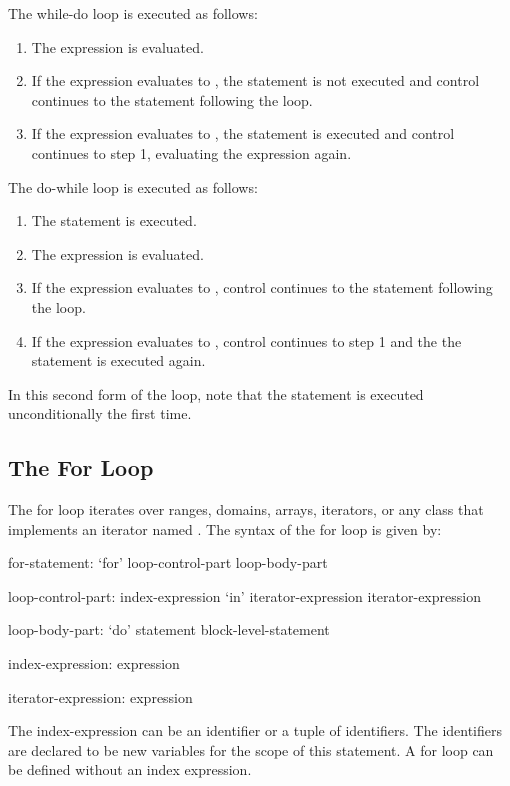 The while-do loop is executed as follows:
\begin{enumerate}
\item The expression is evaluated.
\item If the expression evaluates to , the statement is
  not executed and control continues to the statement following the
  loop.
\item If the expression evaluates to , the statement is
  executed and control continues to step 1, evaluating the expression
  again.
\end{enumerate}

The do-while loop is executed as follows:
\begin{enumerate}
\item The statement is executed.
\item The expression is evaluated.
\item If the expression evaluates to , control continues
  to the statement following the loop.
\item If the expression evaluates to , control continues to
  step 1 and the the statement is executed again.
\end{enumerate}
In this second form of the loop, note that the statement is executed
unconditionally the first time.

\subsection{The For Loop}
\label{The_For_Loop}


The for loop iterates over ranges, domains, arrays, iterators, or any
class that implements an iterator named .  The syntax of
the for loop is given by:
\begin{syntax}
for-statement:
  `for' loop-control-part loop-body-part

loop-control-part:
  index-expression `in' iterator-expression
  iterator-expression

loop-body-part:
  `do' statement
  block-level-statement

index-expression:
  expression

iterator-expression:
  expression
\end{syntax}

The index-expression can be an identifier or a tuple of identifiers.
The identifiers are declared to be new variables for the scope of this
statement.  A for loop can be defined without an index expression.

